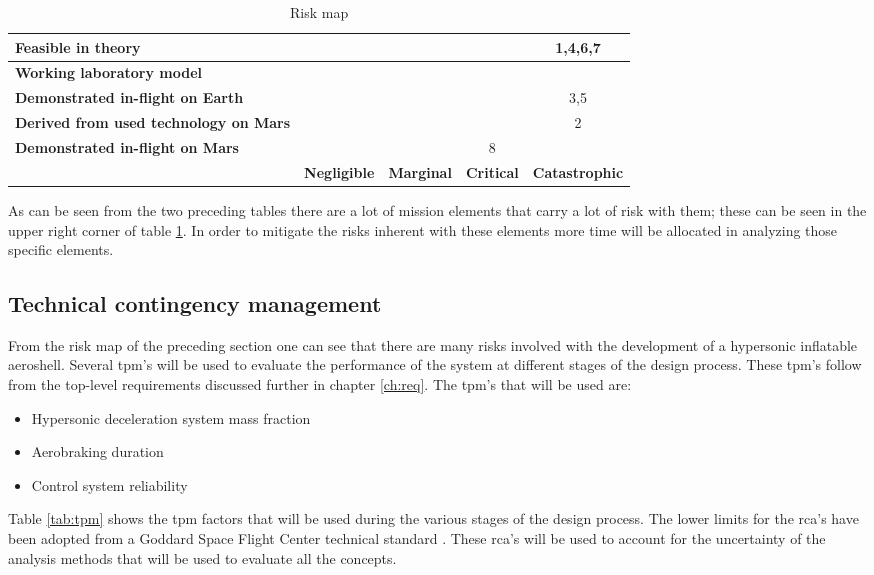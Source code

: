 \begin{table}[h]
\centering
\caption{Risk map}
\label{tab:riskmap}
    \begin{tabular}{|p{6.5cm}|c|c|c|c|}
    \hline
    \textbf{Feasible in theory} & \cellcolor{green} & \cellcolor{yellow} & \cellcolor{red} & \cellcolor{red} 1,4,6,7 \\ \hline
    \textbf{Working laboratory model} & \cellcolor{green} & \cellcolor{yellow} & \cellcolor{red} & \cellcolor{red} \\ \hline
    \textbf{Demonstrated in-flight on Earth} & \cellcolor{green} & \cellcolor{yellow} & \cellcolor{yellow} & \cellcolor{yellow} 3,5 \\ \hline
    \textbf{Derived from used technology on Mars} & \cellcolor{green} & \cellcolor{yellow} & \cellcolor{yellow} & \cellcolor{yellow} 2 \\ \hline
    \textbf{Demonstrated in-flight on Mars} & \cellcolor{green} & \cellcolor{green} & \cellcolor{green} 8 & \cellcolor{green} \\ \hline
     & \textbf{Negligible} & \textbf{Marginal} & \textbf{Critical} & \textbf{Catastrophic} \\ \hline
    \end{tabular}
\end{table}

As can be seen from the two preceding tables there are a lot of mission elements that carry a lot of risk with them; these can be seen in the upper right corner of table \ref{tab:riskmap}. In order to mitigate the risks inherent with these elements more time will be allocated in analyzing those specific elements.

\subsection{Technical contingency management}
\label{sec:tca}
From the risk map of the preceding section one can see that there are many risks involved with the development of a hypersonic inflatable aeroshell. Several \gls{tpm}'s  will be used to evaluate the performance of the system at different stages of the design process. These \gls{tpm}'s follow from the top-level requirements discussed further in chapter \ref{ch:req}. The \gls{tpm}'s that will be used are:
\begin{itemize}
	\item Hypersonic deceleration system mass fraction
	\item Aerobraking duration
	\item Control system reliability
\end{itemize}
Table \ref{tab:tpm} shows the \acrfull{tpm} factors that will be used during the various stages of the design process. The lower limits for the \gls{rca}'s have been adopted from a Goddard Space Flight Center technical standard \cite{GoddardSpaceFlightCenter2013}. These \gls{rca}'s will be used to account for the uncertainty of the analysis methods that will be used to evaluate all the concepts.

